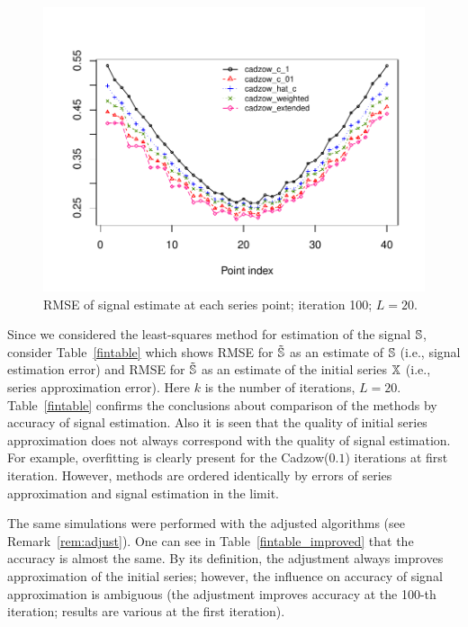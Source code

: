 \documentclass[sii]{ipart}
\begin{document}
\begin{figure}[!hhh]
		\includegraphics[width = \columnwidth]{s1_it100.pdf}
		\caption{RMSE of signal estimate at each series point; iteration 100; $L=20$.}
		\label{fig:s1_it100}
\end{figure}

\smallskip
Since we considered the least-squares method for estimation of the signal $\mathbb{S}$, consider Table~\ref{fintable} which shows RMSE for $\tilde {\mathbb{S}}$ as an estimate of $\mathbb{S}$ (i.e., signal estimation error) and RMSE for $\tilde {\mathbb{S}}$ as an estimate of the initial series $\mathbb{X}$ (i.e., series approximation error). Here $k$ is the number of iterations, $L=20$. Table~\ref{fintable} confirms the conclusions about comparison of the methods by accuracy of signal estimation. Also it is seen that the quality of initial series approximation does not always correspond with the quality of signal estimation. For example, overfitting is clearly present for the Cadzow($0.1$) iterations at first iteration. However, methods are ordered identically by errors of series approximation and signal estimation in the limit.

The same simulations were performed with the adjusted algorithms (see Remark~\ref{rem:adjust}). One can see in Table~\ref{fintable_improved} that the accuracy is almost the same. By its definition, the adjustment always improves approximation of the initial series; however, the influence on accuracy of signal approximation is ambiguous (the adjustment improves accuracy at the 100-th iteration; results are various at the first iteration).
\end{document}
